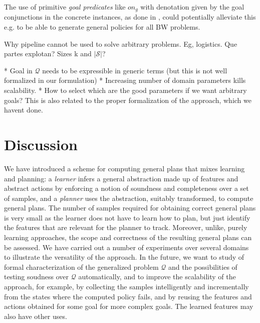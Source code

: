 \documentclass[letterpaper]{article} %
\newcommand{\Omit}[1]{}
\newcommand{\abs}[1]{\ensuremath{\left\vert{#1}\right\vert}}
\newcommand{\Q}{\mathcal{Q}}
\begin{document}
\begin{enumerate}
The use of primitive \emph{goal predicates} like $on_g$ with denotation
given by the goal conjunctions in the concrete instances, as done in
\cite{martin-geffner:generalized}, could potentially alleviate this
e.g. to be able to generate general policies for all BW problems.


Why pipeline cannot be used to solve arbitrary problems. Eg, logistics.
Que partes explotan? Sizes k and $\abs{\mathcal{S}}$?

* Goal in $\Q$ needs to be expressible in generic terms (but this is not well formalized in our formulation)
* Increasing number of domain parameters kills scalability.
* How to select which are the good parameters if we want arbitrary goals? This is also related to the proper formalization
  of the approach, which we havent done.



\end{enumerate}


\section{Discussion}

We have introduced a scheme for computing general plans that mixes
learning and planning: a \emph{learner} infers a general abstraction made
up of features and abstract actions by enforcing a notion of soundness
and completeness over a  set of samples, and a \emph{planner}
uses the abstraction, suitably transformed, to compute general plans. 
The number of samples required for obtaining correct general plans is
very small as the learner does not have to learn how to plan, but
just identify the features that are relevant for the  planner to track.
Moreover, unlike, purely learning approaches, the scope and correctness
of the resulting general plans can be assessed.
We have carried out a number of experiments over several domains to 
illustrate the versatility of the approach. In the future, we want 
to study of formal characterization  of the generalized problem $\Q$ and the possibilities of
testing soudness over $\Q$ automatically, and to improve the scalability of the approach,
for example, by collecting the samples intelligently and incrementally
from the states where the computed policy fails, and by reusing the
features and actions obtained for some goal for more complex goals.
The learned features may also have other uses.

\Omit{
** discussion  of experiments; things we do well and not, scope, lessons. limitations (expressive? scalability?)
** briefly related work, expanding paragraph in intro.
** summary and cconlusions
}



\end{document}
